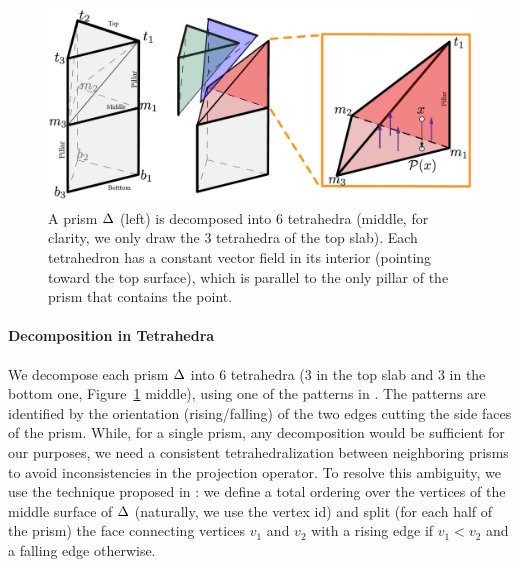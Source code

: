\begin{figure}
    \includegraphics[width=\linewidth]{prism-tex/figs/prism_projection}
    \caption{A prism $\Delta$ (left) is decomposed into 6 tetrahedra (middle, for clarity, we only draw the 3 tetrahedra of the top slab). Each tetrahedron has a constant vector field in its interior (pointing toward the top surface), which is parallel to the only pillar of the prism that contains the point.}
    \label{prism:fig:prism_decomposition}
    
\end{figure}

 \paragraph{Decomposition in Tetrahedra} We decompose each prism $\Delta$ into 6 tetrahedra (3 in the top slab and 3 in the bottom one, Figure~\ref{prism:fig:prism_decomposition} middle), using one of the patterns in \cite[Figure 4]{dompierre1999subdivide}. The patterns are identified by the orientation (rising/falling) of the two edges cutting the side faces of the prism. While, for a single prism, any decomposition would be sufficient for our purposes, we need a consistent tetrahedralization between neighboring prisms to avoid inconsistencies in the projection operator. To resolve this ambiguity, we use the technique proposed in \cite{garimella2000boundary}: we define a total ordering over the vertices of the middle surface of $\Delta$ (naturally, we use the vertex id) and split (for each half of the prism) the face connecting vertices $v_1$ and $v_2$ with a rising edge if $v_1 < v_2$ and a falling edge otherwise. 

